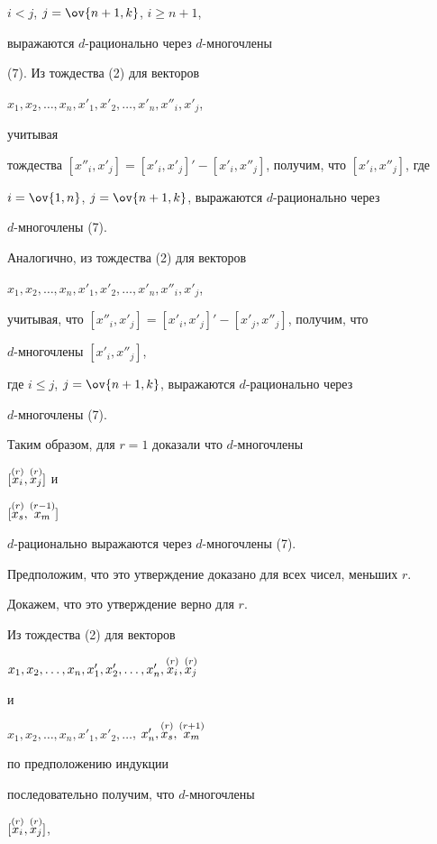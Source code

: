 $i<j$, $j=\ov{n+1,k}$, $i\ge n+1$,


выражаются $d$-рационально через $d$-многочлены


(7). Из тождества (2) для векторов


$x_1,x_2,\dotsc,x_n,x'_1,x'_2,\dotsc,x'_n,x''_i,x'_j$,


учитывая


тождества $[x''_i, x'_j]=[x'_i, x'_j]'-[x'_i, x''_j]$, получим, что $[x'_i, 


x''_j]$, где


$i=\ov{1,n}$, $j=\ov{n+1,k}$, выражаются $d$-рационально через 


$d$-многочлены (7).


Аналогично, из тождества (2) для векторов


$x_1,x_2,\dotsc,x_n,x'_1,x'_2,\dotsc,x'_n,x''_i,x'_j$,


учитывая, что $[x''_i, x'_j]=[x'_i, x'_j]'-[x'_j, x''_j]$, получим, что 


$d$-многочлены $[x'_i, x''_j]$,


где $i\le j$, $j=\ov{n+1,k}$, выражаются $d$-рационально через 


$d$-многочлены (7).


Таким образом, для $r=1$ доказали что $d$-многочлены


$[\overset{(r)}{x_i}{},\overset{(r)}{x_j}{}]$ и


$[\overset{(r)}{x_s}{},\overset{(r-1)}{x_m}{}]$\;


$d$-рационально выражаются через $d$-многочлены (7).


Предположим, что это утверждение доказано для всех чисел, меньших $r$. 


Докажем, что это утверждение верно для $r$.





Из тождества (2) для векторов


$x_1,x_2,\dotsc,x_n,x'_1,x'_2,\dotsc,x'_n,\overset{(r)}{x_i}{},\overset{(r)}{x_j}{}$


и




$x_1,x_2,\dotsc,x_n,x'_1,x'_2,\dotsc$, $x'_n,


\up{(r)}{x_s},\up{(r+1)}{x_m}$


по предположению индукции


последовательно получим, что $d$-многочлены


$[\overset{(r)}{x_i}{},\overset{(r)}{x_j}{}]$,


